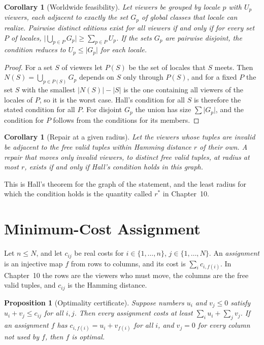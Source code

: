 \documentclass[11pt,twoside,openright]{book}
\theoremstyle{plain}
\newtheorem{proposition}[theorem]{Proposition}
\newtheorem{corollary}[theorem]{Corollary}
\theoremstyle{definition}
\theoremstyle{remark}
\begin{document}
\begin{corollary}[Worldwide feasibility]\label{cor:globalapp}
Let viewers be grouped by locale $p$ with $U_p$ viewers, each adjacent to exactly the set $G_p$ of global classes that locale can realize. Pairwise distinct editions exist for all viewers if and only if for every set $P$ of locales, $\bigl\lvert\bigcup_{p\in P}G_p\bigr\rvert\ge\sum_{p\in P}U_p$. If the sets $G_p$ are pairwise disjoint, the condition reduces to $U_p\le\lvert G_p\rvert$ for each locale.
\end{corollary}

\begin{proof}
For a set $S$ of viewers let $P(S)$ be the set of locales that $S$ meets. Then $N(S)=\bigcup_{p\in P(S)}G_p$ depends on $S$ only through $P(S)$, and for a fixed $P$ the set $S$ with the smallest $\lvert N(S)\rvert-\lvert S\rvert$ is the one containing all viewers of the locales of $P$, so it is the worst case. Hall's condition for all $S$ is therefore the stated condition for all $P$. For disjoint $G_p$ the union has size $\sum\lvert G_p\rvert$, and the condition for $P$ follows from the conditions for its members.
\end{proof}

\begin{corollary}[Repair at a given radius]\label{cor:radiusapp}
Let the viewers whose tuples are invalid be adjacent to the free valid tuples within Hamming distance $r$ of their own. A repair that moves only invalid viewers, to distinct free valid tuples, at radius at most $r$, exists if and only if Hall's condition holds in this graph.
\end{corollary}

This is Hall's theorem for the graph of the statement, and the least radius for which the condition holds is the quantity called $r^*$ in Chapter~10.

\section{Minimum-Cost Assignment}\label{sec:assignapp}

Let $n\le N$, and let $c_{ij}$ be real costs for $i\in\{1,\dots,n\}$, $j\in\{1,\dots,N\}$. An \emph{assignment} is an injective map $f$ from rows to columns, and its cost is $\sum_ic_{i,f(i)}$. In Chapter~10 the rows are the viewers who must move, the columns are the free valid tuples, and $c_{ij}$ is the Hamming distance.

\begin{proposition}[Optimality certificate]\label{prop:certapp}
Suppose numbers $u_i$ and $v_j\le0$ satisfy $u_i+v_j\le c_{ij}$ for all $i,j$. Then every assignment costs at least $\sum_iu_i+\sum_jv_j$. If an assignment $f$ has $c_{i,f(i)}=u_i+v_{f(i)}$ for all $i$, and $v_j=0$ for every column not used by $f$, then $f$ is optimal.
\end{proposition}
\end{document}

